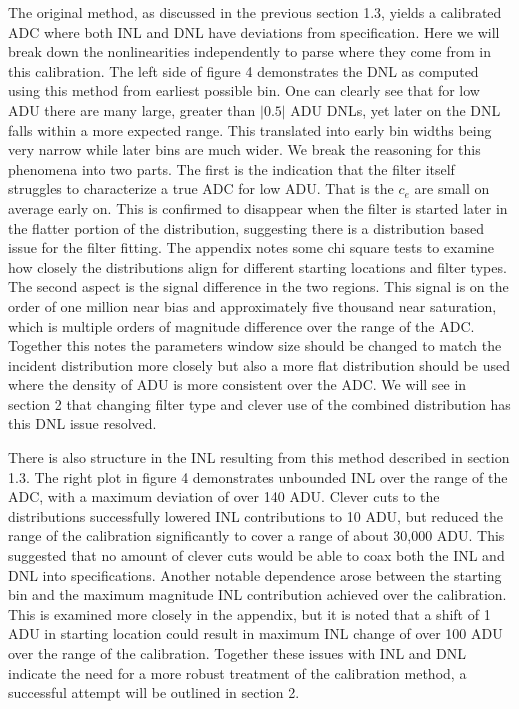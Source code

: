 \documentclass[11pt, letterpaper]{article}
\begin{document}
The original method, as discussed in the previous section 1.3, yields a calibrated ADC where both INL and DNL have deviations from specification. 
Here we will break down the nonlinearities independently to parse where they come from in this calibration. 
The left side of figure 4 demonstrates the DNL as computed using this method from earliest possible bin. 
One can clearly see that for low ADU there are many large, greater than $|0.5|$ ADU DNLs, yet later on the DNL falls within a more expected range. 
This translated into early bin widths being very narrow while later bins are much wider. 
We break the reasoning for this phenomena into two parts. 
The first is the indication that the filter itself struggles to characterize a true ADC for low ADU.
That is the $c_{e}$ are small on average early on. 
This is confirmed to disappear when the filter is started later in the flatter portion of the distribution, suggesting there is a distribution based issue for the filter fitting. 
The appendix notes some chi square tests to examine how closely the distributions align for different starting locations and filter types. 
The second aspect is the signal difference in the two regions. 
This signal is on the order of one million near bias and approximately five thousand near saturation, which is multiple orders of magnitude difference over the range of the ADC.
Together this notes the parameters window size should be changed to match the incident distribution more closely but also a more flat distribution should be used where the density of ADU is more consistent over the ADC.
We will see in section 2 that changing filter type and clever use of the combined distribution has this DNL issue resolved. 
\indent 


There is also structure in the INL resulting from this method described in section 1.3.
The right plot in figure 4 demonstrates unbounded INL over the range of the ADC, with a maximum deviation of over 140 ADU. 
Clever cuts to the distributions successfully lowered INL contributions to 10 ADU, but reduced the range of the calibration significantly to cover a range of about 30,000 ADU. 
This suggested that no amount of clever cuts would be able to coax both the INL and DNL into specifications. 
Another notable dependence arose between the starting bin and the maximum magnitude INL contribution achieved over the calibration. 
This is examined more closely in the appendix, but it is noted that a shift of 1 ADU in starting location could result in maximum INL change of over 100 ADU over the range of the calibration. 
Together these issues with INL and DNL indicate the need for a more robust treatment of the calibration method, a successful attempt will be outlined in section 2.
\end{document}
